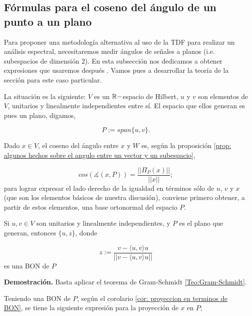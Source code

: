\subsection{Fórmulas para el coseno del ángulo de un punto a un plano}
\label{ap: Caso particular en el que el subespacio en cuestión es un plano}

Para proponer una 
metodología 
alternativa al uso de la TDF
para realizar un análisis espectral,
necesitaremos medir ángulos de señales a planos
(i.e. subespacios de dimensión $2$).
En esta subsección nos dedicamos a 
obtener expresiones que usaremos después 
. Vamos pues a 
desarrollar la teoría de la sección
para este caso particular.

La situación es la siguiente: $V$ es un $\mathbb{R}-$espacio
de Hilbert, $u$ y $v$ son elementos de $V$,
unitarios y linealmente
independientes entre sí. El espacio que ellos generan
es pues un plano, digamos,


\[
P := span \{ u, v \}.
\]

\noindent
Dado $x \in V$,
el coseno del ángulo entre $x$ y $W$ es,
según la proposición
\ref{prop: algunos hechos sobre el angulo entre un vector y un subespacio},

\begin{equation}
\label{eq0: 19Marzo}
cos \left( \measuredangle (x, P) \right) = 
\frac{|| \Pi_{P}(x) ||}{||x||};
\end{equation}
para lograr expresar el lado derecho de la igualdad en términos
sólo de $u$, $v$ y $x$ (que son los elementos básicos de
nuestra discusión), conviene primero obtener, a partir 
de estos elementos, una base
ortonormal del espacio $P$.


\begin{obs}
Si $u, v \in V$ son unitarios y linealmente independientes, y $P$
es el plano que generan, entonces
$\{ u, z \}$, donde

\begin{equation}
\label{eq2: 19Marzo}
z:= \frac{v- \langle u, v \rangle u}{||v- \langle u, v \rangle u||}
\end{equation}
es una BON de $P$
\end{obs}
\noindent
\textbf{Demostración.}
Basta aplicar el teorema de Gram-Schmidt 
\ref{Teo:Gram-Schmidt}.
\QEDB
\vspace{0.2cm}

Teniendo una BON de $P$, según el 
corolario 
\ref{cor: proyeccion en terminos de BON}, se tiene la siguiente
expresión para la proyección de $x$ en $P$;

